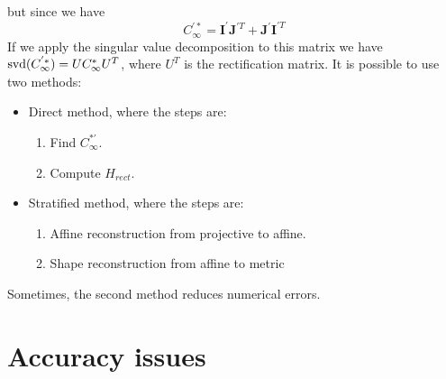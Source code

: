 \documentclass[12pt, a4paper]{report}
\newtheorem[style=M,bodystyle=\normalfont]{theorem}{Theorem}
\newtheorem[style=M,bodystyle=\normalfont]{corollary}{Corollary}
\newtheorem[style=M,bodystyle=\normalfont]{lemma}{Lemma}
\newtheorem[style=M,bodystyle=\normalfont]{definition}{Definition}
\begin{document}
\begin{itemize}
\begin{enumerate}
                    but since we have 
                    \[C_{\infty}^{'*}=\boldsymbol{I}^{'}\boldsymbol{J}^{'T}+\boldsymbol{J}^{'}\boldsymbol{I}^{'T}\]
                    If we apply the singular value decomposition to this matrix we have $\textnormal{svd}(C_{\infty}^{'*})=UC_{\infty}^{*}U^T$, where 
                    $U^T$ is the rectification matrix. It is possible to use two methods: 
                    \begin{itemize}
                        \item Direct method, where the steps are: 
                            \begin{enumerate}
                                \item Find $C_{\infty}^{*'}$. 
                                \item Compute $H_{rect}$. 
                            \end{enumerate}
                        \item Stratified method, where the steps are: 
                            \begin{enumerate}
                                \item Affine reconstruction from projective to affine. 
                                \item Shape reconstruction from affine to metric
                            \end{enumerate}
                    \end{itemize}
                    Sometimes, the second method reduces numerical errors. 
            \end{enumerate}
    \end{itemize}

    \section{Accuracy issues}
\end{document}
